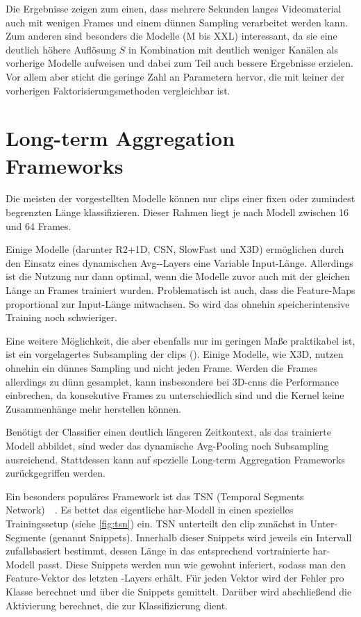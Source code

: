 Die Ergebnisse zeigen zum einen, dass mehrere Sekunden langes Videomaterial auch mit wenigen Frames und einem dünnen Sampling verarbeitet werden kann.
Zum anderen sind besonders die Modelle (M bis XXL) interessant, da sie eine deutlich höhere Auflösung $S$ in Kombination mit deutlich weniger Kanälen als vorherige Modelle aufweisen und dabei zum Teil auch bessere Ergebnisse erzielen.
Vor allem aber sticht die geringe Zahl an Parametern hervor, die mit keiner der vorherigen Faktorisierungsmethoden vergleichbar ist.


\section{Long-term Aggregation Frameworks}
\label{sec:long-term-aggregation-frameworks}

Die meisten der vorgestellten Modelle können nur \glspl{clip} einer fixen oder zumindest begrenzten Länge klassifizieren.
Dieser Rahmen liegt je nach Modell zwischen 16 und 64 Frames.

Einige Modelle (darunter R2+1D, CSN, SlowFast und X3D) ermöglichen durch den Einsatz eines dynamischen Avg-\pool-Layers eine Variable Input-Länge.
Allerdings ist die Nutzung nur dann optimal, wenn die Modelle zuvor auch mit der gleichen Länge an Frames trainiert wurden.
Problematisch ist auch, dass die Feature-Maps proportional zur Input-Länge mitwachsen.
So wird das ohnehin speicherintensive Training noch schwieriger.

Eine weitere Möglichkeit, die aber ebenfalls nur im geringen Maße praktikabel ist, ist ein vorgelagertes Subsampling der \glspl{clip} (\cite{Ng15}).
Einige Modelle, wie X3D, nutzen ohnehin ein dünnes Sampling und nicht jeden Frame.
Werden die Frames allerdings zu dünn gesamplet, kann insbesondere bei 3D-\glspl{cnn} die Performance einbrechen, da konsekutive Frames zu unterschiedlich sind und die Kernel keine Zusammenhänge mehr herstellen können.

Benötigt der Classifier einen deutlich längeren Zeitkontext, als das trainierte Modell abbildet, sind weder das dynamische Avg-Pooling noch Subsampling ausreichend.
Stattdessen kann auf spezielle Long-term Aggregation Frameworks zurückgegriffen werden.

Ein besonders populäres Framework ist das TSN (Temporal Segments Network)~\cite{Wang16}~\cite{Wang19}.
Es bettet das eigentliche \gls{har}-Modell in einen spezielles Trainingssetup (siehe \autoref{fig:tsn}) ein.
TSN unterteilt den \gls{clip} zunächst in Unter-Segmente (genannt Snippets).
Innerhalb dieser Snippets wird jeweils ein Intervall zufallsbasiert bestimmt, dessen Länge in das entsprechend vortrainierte \gls{har}-Modell passt.
Diese Snippets werden nun wie gewohnt inferiert, sodass man den Feature-Vektor des letzten \fc-Layers erhält.
Für jeden Vektor wird der Fehler pro Klasse berechnet und über die Snippets gemittelt.
Darüber wird abschließend die Aktivierung berechnet, die zur Klassifizierung dient.

